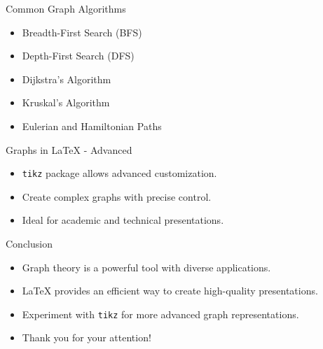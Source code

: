 \documentclass{beamer}
\begin{document}
\begin{frame}{Common Graph Algorithms}
    \begin{itemize}
        \item Breadth-First Search (BFS)
        \item Depth-First Search (DFS)
        \item Dijkstra's Algorithm
        \item Kruskal's Algorithm
        \item Eulerian and Hamiltonian Paths
    \end{itemize}
\end{frame}

\begin{frame}{Graphs in \LaTeX{} - Advanced}
    \begin{itemize}
        \item \texttt{tikz} package allows advanced customization.
        \item Create complex graphs with precise control.
        \item Ideal for academic and technical presentations.
    \end{itemize}
\end{frame}

\begin{frame}{Conclusion}
    \begin{itemize}
        \item Graph theory is a powerful tool with diverse applications.
        \item \LaTeX{} provides an efficient way to create high-quality presentations.
        \item Experiment with \texttt{tikz} for more advanced graph representations.
        \item Thank you for your attention!
    \end{itemize}
\end{frame}
\end{document}
